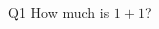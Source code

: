  {\begin{question}{Q1}
 How much is $1+1$?
 \begin{multicols}{2}\AMCBoxedAnswers\begin{choices}
 \end{choices}\end{multicols}\end{question}
}
 

